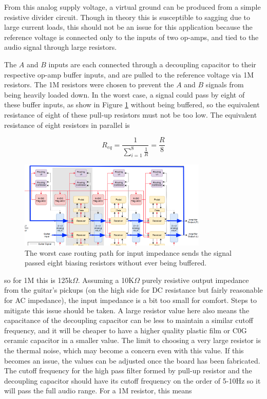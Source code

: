 \documentclass{article}
\begin{document}
	From this analog supply voltage, a virtual ground can be produced from a simple resistive divider circuit.  Though in theory this is susceptible to sagging due to large current loads, this should not be an issue for this application because the reference voltage is connected only to the inputs of two op-amps, and tied to the audio signal through large resistors.

	The $A$ and $B$ inputs are each connected through a decoupling capacitor to their respective op-amp buffer inputs, and are pulled to the reference voltage via 1M resistors.  The 1M resistors were chosen to prevent the $A$ and $B$ signals from being heavily loaded down.  In the worst case, a signal could pass by eight of these buffer inputs, as show in Figure \ref{fig:worstcaserouting} without being buffered, so the equivalent resistance of eight of these pull-up resistors must not be too low.  The equivalent resistance of eight resistors in parallel is

	$$ R_{eq} = \frac{1}{\sum\limits_{i=1}^{8}\frac{1}{R}} = \frac{R}{8} $$

	\begin{figure}
		\centering
		\includegraphics[width = 0.8\textwidth]{PR4Images/WorstCaseInputImpedancePath.png}
		\caption{The worst case routing path for input impedance sends the signal passed eight biasing resistors without ever being buffered.}
		\label{fig:worstcaserouting}
	\end{figure}

	so for 1M this is 125k$\Omega$.  Assuming a 10K$\Omega$ purely resistive output impedance from the guitar's pickups (on the high side for DC resistance but fairly reasonable for AC impedance), the input impedance is a bit too small for comfort.  Steps to mitigate this issue should be taken. A large resistor value here also means the capacitance of the decoupling capacitor can be less to maintain a similar cutoff frequency, and it will be cheaper to have a higher quality plastic film or C0G ceramic capacitor in a smaller value.  The limit to choosing a very large resistor is the thermal noise, which may become a concern even with this value.  If this becomes an issue, the values can be adjusted once the board has been fabricated.  The cutoff frequency for the high pass filter formed by pull-up resistor and the decoupling capacitor should have its cutoff frequency on the order of 5-10Hz so it will pass the full audio range.  For a 1M resistor, this means
\end{document}
